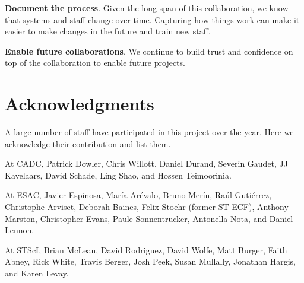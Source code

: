 \documentclass[11pt,twoside]{article}
\begin{document}
\textbf{Document the process}.
Given the long span of this collaboration, we know that systems and staff change over time. 
Capturing how things work can make it easier to make changes in the future and train new staff.

\textbf{Enable future collaborations}.
We continue to build trust and confidence on top of the collaboration to enable future projects.

\section{Acknowledgments}

A large number of staff have participated in this project over the year. 
Here we acknowledge their contribution and list them.

At CADC, Patrick Dowler, Chris Willott, Daniel Durand, Severin Gaudet, JJ Kavelaars, David Schade, Ling Shao, and Hossen Teimoorinia.

At ESAC, Javier Espinosa, María Arévalo, Bruno Merín, Raúl Gutiérrez, Christophe Arviset, Deborah Baines, Felix Stoehr (former ST-ECF), Anthony Marston, Christopher Evans, Paule Sonnentrucker, Antonella Nota, and Daniel Lennon.

At STScI, Brian McLean, David Rodriguez, David Wolfe, Matt Burger, Faith Abney, Rick White, Travis Berger, Josh Peek, Susan Mullally, Jonathan Hargis, and Karen Levay.



\end{document}
